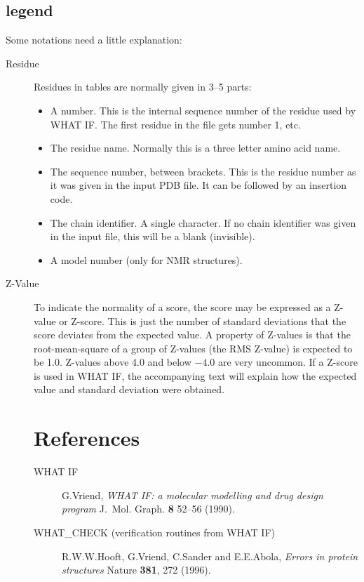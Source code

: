 \subsection{legend}
Some notations need a little explanation:
\begin{description}
\item[Residue] Residues in tables are normally given in 3--5 parts:
\begin{itemize}
\item A number. This is the internal sequence number of the residue used
      by WHAT IF. The first residue in the file gets number 1, etc.
\item The residue name. Normally this is a three letter amino acid name.
\item The sequence number, between brackets. This is the residue number
      as it was given in the input PDB file. It can be followed by an
      insertion code.
\item The chain identifier. A single character. If no chain identifier
      was given in the input file, this will be a blank (invisible).
\item A model number (only for NMR structures).
\end{itemize}
\item[Z-Value] To indicate the normality of a score, the score
   may be expressed as a Z-value or Z-score. This is just the number
   of standard deviations that the score deviates from the expected
   value.  A property of Z-values is that the root-mean-square of a
   group of Z-values (the RMS Z-value) is expected to be 1.0. Z-values
   above 4.0 and below $-4.0$ are very uncommon. If a Z-score is used
   in WHAT IF, the accompanying text will explain how the expected
   value and standard deviation were obtained.
\section{References}
\raggedright

\begin{description}

\item [WHAT IF]
G.Vriend,
{\em WHAT IF: a molecular modelling and drug design program}
J.~Mol. Graph. {\bf 8} 52--56 (1990).

\item [WHAT\_CHECK (verification routines from WHAT IF)]
R.W.W.Hooft, G.Vriend, C.Sander and E.E.Abola,
{\em Errors in protein structures}
Nature {\bf 381}, 272 (1996).


\end{description}
\end{description}
